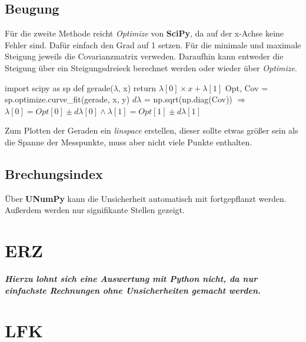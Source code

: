 \documentclass[a4paper,12pt]{article}
\begin{document}
\subsection{Beugung}
Für die zweite Methode reicht \textit{Optimize} von \textbf{SciPy}, da auf der x-Achse keine Fehler sind. Dafür einfach den Grad auf 1 setzen.
Für die minimale und maximale Steigung jeweils die Covarianzmatrix verweden. \newline
Daraufhin kann entweder die Steigung über ein Steigungsdreieck berechnet werden oder wieder über \textit{Optimize}.
\begin{center}
\begin{tcolorbox}[colback=gray!20, colframe=black, width=1\textwidth, boxrule=1pt, arc=1mm]
import scipy as sp \newline
def gerade($\lambda$, x) \newline
\hspace*{1cm} return $\lambda[0] \times x + \lambda[1]$ \newline
Opt, Cov = sp.optimize.curve\_fit(gerade, x, y) \newline
$d\lambda$ = np.sqrt(np.diag(Cov)) \newline
$\Rightarrow$ \newline
$\lambda[0] = Opt[0] \pm d\lambda[0] \land \lambda[1] = Opt[1] \pm d\lambda[1] $
\end{tcolorbox}
\end{center}
Zum Plotten der Geraden ein \textit{linspace} erstellen, dieser sollte etwas größer sein als die Spanne der Messpunkte, muss aber nicht viele Punkte enthalten.

\subsection{Brechungsindex}
Über \textbf{UNumPy} kann die Unsicherheit automatisch mit fortgepflanzt werden. Außerdem werden nur signifikante Stellen gezeigt.



\section{ERZ}
\textit{\textbf{Hierzu lohnt sich eine Auswertung mit Python nicht, da nur einfachste Rechnungen ohne Unsicherheiten gemacht werden.}}



\section{LFK}
\end{document}
